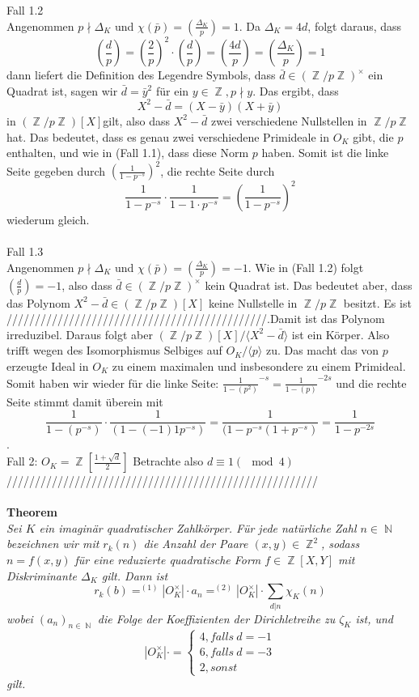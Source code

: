 \documentclass[10pt,a4paper]{article}
\DeclareMathOperator{\Z}{\mathbb{Z}}
\DeclareMathOperator{\N}{\mathbb{N}}
\begin{document}
\\
\\
Fall 1.2
\\
Angenommen $p \nmid \Delta_K$ und $\chi(\bar{p})=(\frac{\Delta_K}{p})= 1$. Da $\Delta_K = 4d$, folgt daraus, dass $$(\frac{d}{p})=(\frac{2}{p})^2\cdot (\frac{d}{p})=(\frac{4d}{p})=(\frac{\Delta_K}{p})=1$$ dann liefert die Definition des Legendre Symbols, dass $\bar{d} \in (\Z/p\Z)^\times$ ein Quadrat ist, sagen wir $\bar{d}=\bar{y}^2$ für ein $y \in \Z, p\nmid y$. Das ergibt, dass $$X^2-\bar{d}=(X-\bar{y})(X+\bar{y})$$ in $(\Z/p\Z)[X] $gilt, also dass $X^2-\bar{d}$ zwei verschiedene Nullstellen in $\Z/p\Z$ hat. Das bedeutet, dass es genau zwei verschiedene Primideale in $O_K$ gibt, die $p$ enthalten, und wie in (Fall 1.1), dass diese Norm $p$ haben. Somit ist die linke Seite gegeben durch $(\frac{1}{1-p^{-s}})^2$, die rechte Seite durch $$\frac{1}{1-p^{-s}}\cdot\frac{1}{1-1\cdot p^{-s}}=(\frac{1}{1-p^{-s}})^2$$ wiederum gleich.
\\
\\
Fall 1.3
\\
Angenommen $p \nmid \Delta_K$ und $\chi(\bar{p})=(\frac{\Delta_K}{p})= -1$. Wie in (Fall 1.2) folgt $(\frac{d}{p})=-1$, also dass $\bar{d} \in (\Z/p\Z)^\times$ kein Quadrat ist. Das bedeutet aber, dass das Polynom $X^2-\bar{d} \in (\Z/p\Z)[X] $ keine Nullstelle in $\Z/p\Z$ besitzt. Es ist //////////////////////////////////////////////.Damit ist das Polynom irreduzibel. Daraus folgt aber $(\Z/p\Z)[X]/\langle X^{2}-\bar{d}\rangle$ ist ein Körper. Also trifft wegen des Isomorphismus Selbiges auf $O_K/\langle p\rangle$ zu. Das macht das von $p$ erzeugte Ideal in $O_K$ zu einem maximalen und insbesondere zu einem Primideal. Somit haben wir wieder für die linke Seite: $\frac{1}{1-(p^{2})}^{-s}=\frac{1}{1-(p)}^{-2s}$ und die rechte Seite stimmt damit überein mit $$\frac{1}{1-(p^{-s})}\cdot\frac{1}{(1-(-1)1p^{-s})}=\frac{1}{(1-p^{-s}(1+p^{-s})}=\frac{1}{1-p^{-2s}}$$.
\\
Fall 2: $O_K= \Z[\frac{1+\sqrt{d}}{2}]$
Betrachte also $d\equiv 1 (\mod 4)$
///////////////////////////////////////////////////////
\\
\\
\textbf{Theorem}
\\
\textit{Sei $\textit{K}$ ein imaginär quadratischer Zahlkörper. Für jede natürliche Zahl $n \in \N$ bezeichnen wir mit $r_k(n)$ die Anzahl der Paare $(x,y) \in \Z^2$, sodass $n = f(x,y)$ für eine reduzierte quadratische Form $f \in \Z[X,Y]$ mit Diskriminante $\Delta_K$ gilt. Dann ist $$r_k(b) =^{(1)} |O_K^\times|\cdot a_n =^{(2)} |O_K^\times|\cdot \sum_{d|n}\chi_K(n)$$wobei $(a_n)_{n \in \N}$ die Folge der Koeffizienten der Dirichletreihe zu $\zeta_K$ ist, und $$|O_K^\times|\cdot =\begin{cases}4, falls \ d = -1\\6, falls \ d = -3\\2, sonst\end{cases}$$ gilt.}
\end{document}
